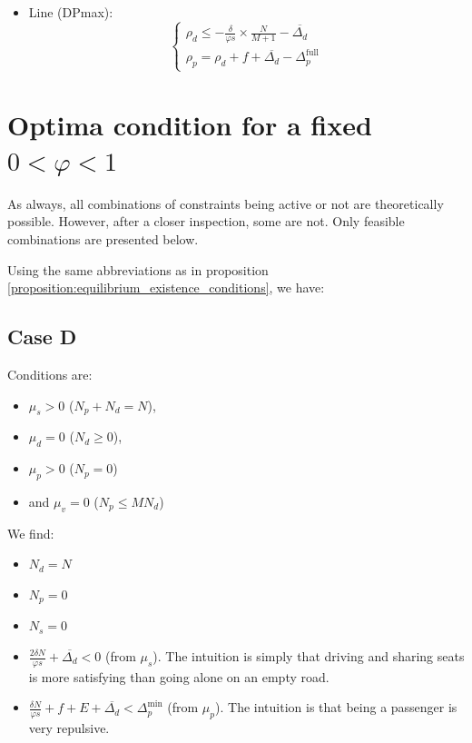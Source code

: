 \documentclass[english, a4paper]{article}
\theoremstyle{plain}
\theoremstyle{definition}
\theoremstyle{remark}
\begin{document}
\begin{itemize}
    \item Line (DPmax):
    \begin{equation*}
        \left\{
        \begin{array}{l}
            \rho_d \leq - \frac{\delta}{\varphi s} \times \frac{N}{M+1} - \overline{\Delta_d}\\
            \rho_p = \rho_d + f + \overline{\Delta_d} - \Delta_p^{\text{full}}             
        \end{array}
        \right.
    \end{equation*}
    
\end{itemize}

\section{Optima condition for a fixed \texorpdfstring{$0< \varphi < 1$}{0 < varphi 1}}
\label{appendix:optima_condition_fixed_varphi}

As always, all combinations of constraints being active or not are theoretically possible. However, after a closer inspection, some are not. Only feasible combinations are presented below.

Using the same abbreviations as in proposition \ref{proposition:equilibrium_existence_conditions}, we have:


\subsection{Case D}

Conditions are: \begin{itemize}
    \item $\mu_s > 0$ ($N_p + N_d = N$),
    \item $\mu_d = 0$ ($N_d \geq 0$),
    \item $\mu_p > 0$ ($N_p = 0$)
    \item and $\mu_v = 0$ ($N_p \leq MN_d$)
\end{itemize}

We find:
\begin{itemize}
    \item $N_d = N$
    \item $N_p = 0$
    \item $N_s = 0$
    \item $\frac{2\delta N}{\varphi s} + \overline{\Delta_d} < 0$ (from $\mu_s$). The intuition is simply that driving and sharing seats is more satisfying than going alone on an empty road.
    \item $\frac{\delta N}{\varphi s} + f + E + \overline{\Delta_d} < \Delta_p^{\text{min}}$ (from $\mu_p$). The intuition is that being a passenger is very repulsive.
\end{itemize}
\end{document}
